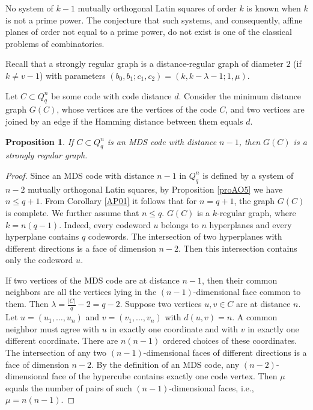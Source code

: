 \documentclass[11pt]{article}
\newtheorem{claim}{Proposition}[section]
\theoremstyle{definition}
\begin{document}
{{{No system of $k-1$ mutually orthogonal Latin
squares of order $k$ is known when $k$ is not a prime
power. The conjecture that such systems, and consequently,
affine planes of order not equal to a prime power, do not
exist is one of the classical problems of combinatorics.
\label{PGprob}


Recall that a strongly regular graph is a distance-regular graph of
diameter $2$ (if $k\neq v-1$) with parameters $(b_0, b_1; c_1, c_2)=
(k, k-\lambda-1; 1, \mu)$.

Let $C\subset Q^n_q$ be some code with code distance $d$.
Consider the minimum distance graph $G(C)$, whose vertices
are the vertices of the code $C$, and two vertices are joined by an edge if
the Hamming distance between them equals $d$.

\begin{claim}
If $C\subset Q^n_q$ is an {\rm MDS} code with distance $n-1$, then
$G(C)$ is a strongly regular graph.
\end{claim}
\begin{proof}
Since an {\rm MDS} code with distance $n-1$ in $Q^n_q$ is defined by
a system of $n-2$ mutually orthogonal Latin squares, by
Proposition \ref{proAO5} we have $n\leq q+1$. From Corollary \ref{AP01}
it follows that for $n=q+1$, the graph $G(C)$ is complete. We
further assume that $n\leq q$. 
$G(C)$ is a $k$-regular graph, where $k=n(q-1)$. Indeed, every codeword $u$ belongs to $n$ hyperplanes and every hyperplane contains $q$ codewords. The intersection of two hyperplanes with different directions  is a
face of dimension $n-2$. Then this intersection contains only the  codeword $u$. 

If two vertices of the {\rm MDS} code are at
distance $n-1$, then their common neighbors are all the vertices
lying in the $(n-1)$-dimensional face common to them. Then
$\lambda=\frac{|C|}{q}-2=q-2$. Suppose two vertices $u,v\in C$
are at distance $n$. Let $u=(u_1,\dots,u_n)$ and $v=(v_1,\dots,v_n)$ with $d(u,v)=n$. 
A common neighbor must agree with $u$ in exactly one coordinate and with $v$ in exactly one different coordinate. There are $n(n-1)$ ordered choices of these coordinates.
The intersection of any two $(n-1)$-dimensional
faces of different directions  is a
face of dimension $n-2$. By the definition of an {\rm MDS} code, any
$(n-2)$-dimensional face of the hypercube contains exactly one code vertex.
Then $\mu$ equals the number of pairs of such $(n-1)$-dimensional faces, i.e.,
$\mu=n(n-1)$.
\end{proof}

}}}
\end{document}

